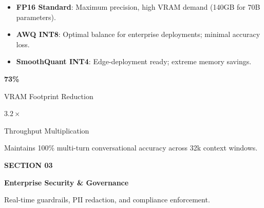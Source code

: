 \documentclass[20pt,landscape,a4paper]{foils}
\begin{document}
\noindent
\begin{minipage}[t]{0.48\textwidth}
  \begin{tcolorbox}[basebox, title={\textcolor{NavyPrimary}{\large \faCogs~ \textbf{Precision Trade-offs}}}, fonttitle=\bfseries]
    \begin{itemize}[leftmargin=14pt, label=\textcolor{TealAccent}{\small\faCheck}]
      \item \textbf{FP16 Standard}: Maximum precision, high VRAM demand (140GB for 70B parameters).
      \item \textbf{AWQ INT8}: Optimal balance for enterprise deployments; minimal accuracy loss.
      \item \textbf{SmoothQuant INT4}: Edge-deployment ready; extreme memory savings.
    \end{itemize}
  \end{tcolorbox}
\end{minipage}%
\hfill
\begin{minipage}[t]{0.48\textwidth}
  \begin{tcolorbox}[amberbox, title={\textcolor{NavyPrimary}{\large \faChartLine~ \textbf{Resource Savings}}}, fonttitle=\bfseries]
    \centering
    \vspace{4pt}
    {\Huge\bfseries\textcolor{AmberAccent}{73\%}} \par
    {\small VRAM Footprint Reduction} \par\vspace{6pt}
    {\Huge\bfseries\textcolor{NavyPrimary}{$3.2\times$}} \par
    {\small Throughput Multiplication} \par\vspace{6pt}
    \small Maintains 100\% multi-turn conversational accuracy across 32k context windows.
  \end{tcolorbox}
\end{minipage}
\pagebreak

\vspace*{0.8cm}
\begin{tcolorbox}[enhanced, colback=SlateLight, colframe=NavyPrimary, boxrule=3pt, arc=6pt, boxsep=16pt]
  \textcolor{TealAccent}{\Large \textbf{SECTION 03}} \par\vspace{6pt}
  {\Huge\bfseries Enterprise Security \& Governance} \par\vspace{10pt}
  \textcolor{CharcoalText}{\large Real-time guardrails, PII redaction, and compliance enforcement.}
\end{tcolorbox}
\pagebreak
\end{document}

